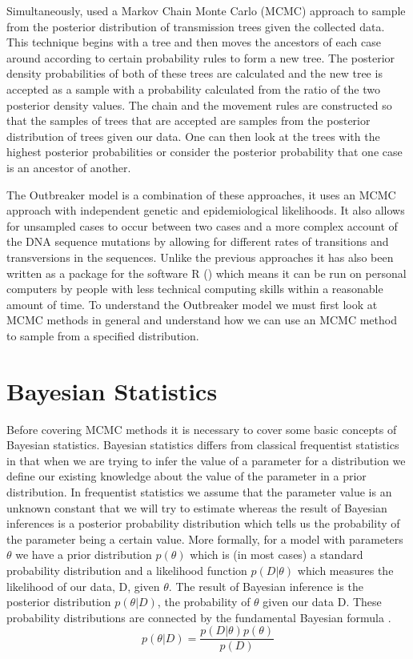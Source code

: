 \documentclass[11pt,a4paper]{report}
\begin{document}
Simultaneously, \citet{Morelli12} used a Markov Chain Monte Carlo (MCMC) approach to sample from the posterior distribution of transmission trees given the collected data. This technique begins with a tree and then moves the ancestors of each case around according to certain probability rules to form a new tree. The posterior density probabilities of both of these trees are calculated and the new tree is accepted as a sample with a probability calculated from the ratio of the two posterior density values. The chain and the movement rules are constructed so that the samples of trees that are accepted are samples from the posterior distribution of trees given our data. One can then look at the trees with the highest posterior probabilities or consider the posterior probability that one case is an ancestor of another.

The Outbreaker model is a combination of these approaches, it uses an MCMC approach with independent genetic and epidemiological likelihoods. It also allows for unsampled cases to occur between two cases and a more complex account of the DNA sequence mutations by allowing for different rates of transitions and transversions in the sequences. Unlike the previous approaches it has also been written as a package for the software R (\citet{R14}) which means it can be run on personal computers by people with less technical computing skills within a reasonable amount of time. To understand the Outbreaker model we must first look at MCMC methods in general and understand how we can use an MCMC method to sample from a specified distribution.

\section{Bayesian Statistics}
Before covering MCMC methods it is necessary to cover some basic concepts of Bayesian statistics. Bayesian statistics differs from classical frequentist statistics in that when we are trying to infer the value of a parameter for a distribution we define our existing knowledge about the value of the parameter in a prior distribution. In frequentist statistics we assume that the parameter value is an unknown constant that we will try to estimate whereas the result of Bayesian inferences is a posterior probability distribution which tells us the probability of the parameter being a certain value. More formally, for a model with parameters $\theta$ we have a prior distribution $p(\theta)$ which is (in most cases) a standard probability distribution and a likelihood function $p(D | \theta)$ which measures the likelihood of our data, D, given $\theta$. The result of Bayesian inference is the posterior distribution $p(\theta | D)$, the probability of $\theta$ given our data D. These probability distributions are connected by the fundamental Bayesian formula \citep{Robert07}.  
\begin{equation}
p(\theta | D) = \frac{p(D | \theta)p(\theta)}{p(D)}
\end{equation}
\end{document}
